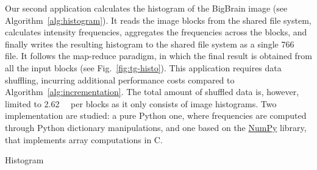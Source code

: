 \documentclass[conference]{IEEEtran}
\begin{document}
 Our second application calculates the histogram of the BigBrain image (see
 Algorithm~\ref{alg:histogram}). It reads the image blocks from the shared
 file system, calculates intensity frequencies, aggregates the frequencies
 across the blocks, and finally writes the resulting histogram to the
 shared file system as a single \SI{766}{\kilo\byte} file. It follows the
 map-reduce paradigm, in which the final result is obtained from all the
 input blocks (see Fig.~\ref{fig:tg-histo}). This application requires data
 shuffling, incurring additional performance costs compared to
 Algorithm~\ref{alg:incrementation}. The total amount of shuffled data is,
 however, limited to \SI{2.62}{\mega\byte} per blocks as it only consists
 of image histograms. Two implementation are studied: a pure Python one,
 where frequencies are computed through Python dictionary manipulations, and one based
 on the \href{https://github.com/numpy}{NumPy} library, that implements array computations in C.

\begin{algorithm}[!t]
    \caption{Histogram}\label{alg:histogram}
    \begin{algorithmic}
    \EndFor
    

    \end{algorithmic}
\end{algorithm}
\end{document}
